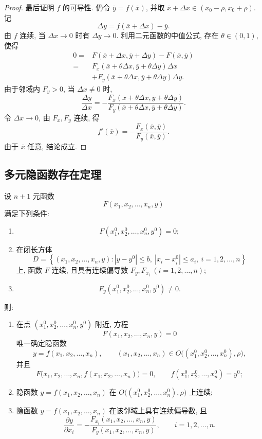 \begin{proof}
	

	最后证明 $f$ 的可导性. 仍令
	$\overline y=f(\overline x)$, 并取
	$\overline x+\Delta x\in(x_0-\rho,x_0+\rho)$. 记
	\[
	\Delta y=f(\overline x+\Delta x)-\overline y.
	\]
	由 $f$ 连续, 当 $\Delta x\to0$ 时有 $\Delta y\to0$.
	利用二元函数的中值公式, 存在 $\theta\in(0,1)$, 使得
	\[
	\begin{aligned}
	0
	={}&F(\overline x+\Delta x,\overline y+\Delta y)-F(\overline x,\overline y)\\
	={}&F_x(\overline x+\theta\Delta x,\overline y+\theta\Delta y)\Delta x\\
	&+F_y(\overline x+\theta\Delta x,\overline y+\theta\Delta y)\Delta y.
	\end{aligned}
	\]
	由于邻域内 $F_y>0$, 当 $\Delta x\ne0$ 时,
	\[
	\frac{\Delta y}{\Delta x}
	=
	-\frac{
	F_x(\overline x+\theta\Delta x,\overline y+\theta\Delta y)}
	{F_y(\overline x+\theta\Delta x,\overline y+\theta\Delta y)}.
	\]
	令 $\Delta x\to0$, 由 $F_x,F_y$ 连续, 得
	\[
	f'(\overline x)
	=
	-\frac{F_x(\overline x,\overline y)}{F_y(\overline x,\overline y)}.
	\]
	由于 $\overline x$ 任意, 结论成立.
\end{proof}
\subsection*{多元隐函数存在定理}
\begin{theorem}[多元隐函数存在定理]
	设 $n+1$ 元函数
	\[
	F(x_1,x_2,\ldots,x_n,y)
	\]
	满足下列条件:
	\begin{enumerate}
		\item
		\[
		F(x_1^0,x_2^0,\ldots,x_n^0,y^0)=0;
		\]
		\item 在闭长方体
		\[
		D=
		\left\{
		(x_1,x_2,\ldots,x_n,y):
		|y-y^0|\le b,\ 
		|x_i-x_i^0|\le a_i,\ i=1,2,\ldots,n
		\right\}
		\]
		上, 函数 $F$ 连续, 且具有连续偏导数
		$F_y,F_{x_i}\ (i=1,2,\ldots,n)$;
		\item
		\[
		F_y(x_1^0,x_2^0,\ldots,x_n^0,y^0)\ne0.
		\]
	\end{enumerate}
	则:
	\begin{enumerate}
		\item[(i)] 在点 $(x_1^0,x_2^0,\ldots,x_n^0,y^0)$ 附近,
		方程
		\[
		F(x_1,x_2,\ldots,x_n,y)=0
		\]
		唯一确定隐函数
		\[
		y=f(x_1,x_2,\ldots,x_n),
		\qquad
		(x_1,x_2,\ldots,x_n)
		\in O\bigl((x_1^0,x_2^0,\ldots,x_n^0),\rho\bigr),
		\]
		并且
		\[
		F\bigl(x_1,x_2,\ldots,x_n,
		f(x_1,x_2,\ldots,x_n)\bigr)=0,
		\qquad
		f(x_1^0,x_2^0,\ldots,x_n^0)=y^0;
		\]
		\item[(ii)] 隐函数 $y=f(x_1,x_2,\ldots,x_n)$
		在 $O\bigl((x_1^0,x_2^0,\ldots,x_n^0),\rho\bigr)$ 上连续;
		\item[(iii)] 隐函数 $y=f(x_1,x_2,\ldots,x_n)$
		在该邻域上具有连续偏导数, 且
		\[
		\frac{\partial y}{\partial x_i}
		=
		-\frac{F_{x_i}(x_1,x_2,\ldots,x_n,y)}
		{F_y(x_1,x_2,\ldots,x_n,y)},
		\qquad i=1,2,\ldots,n.
		\]
	\end{enumerate}
\end{theorem}

